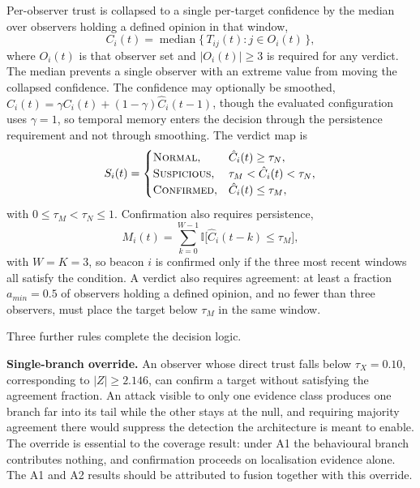 \documentclass[pdflatex,sn-mathphys-num]{sn-jnl}%
\theoremstyle{thmstyleone}%
\theoremstyle{thmstyletwo}%
\theoremstyle{thmstylethree}%
\begin{document}
Per-observer trust is collapsed to a single per-target confidence by the median
over observers holding a defined opinion in that window,
\begin{equation}
\label{eq:median}
C_i(t) = \operatorname{median}\{\, T_{ij}(t) : j \in O_i(t) \,\},
\end{equation}
where $O_i(t)$ is that observer set and $|O_i(t)| \ge 3$ is required for any
verdict. The median prevents a single observer with an extreme value from
moving the collapsed confidence. The confidence may optionally be smoothed,
$\hat C_i(t) = \gamma C_i(t) + (1-\gamma)\hat C_i(t-1)$, though the evaluated
configuration uses $\gamma = 1$, so temporal memory enters the decision through
the persistence requirement and not through smoothing. The verdict map is
\begin{equation}
\label{eq:verdict}
S_i(t) =
\begin{cases}
\textsc{Normal}, & \hat C_i(t) \ge \tau_N,\\
\textsc{Suspicious}, & \tau_M < \hat C_i(t) < \tau_N,\\
\textsc{Confirmed}, & \hat C_i(t) \le \tau_M,
\end{cases}
\end{equation}
with $0 \le \tau_M < \tau_N \le 1$. Confirmation also requires
persistence,
\begin{equation}
\label{eq:persist}
M_i(t) = \sum_{k=0}^{W-1} \mathbb{I}\bigl[\hat C_i(t-k) \le \tau_M\bigr],
\end{equation}
with $W = K = 3$, so beacon $i$ is confirmed only if the three most recent
windows all satisfy the condition. A verdict also requires agreement: at
least a fraction $a_{min} = 0.5$ of observers holding a defined opinion, and no
fewer than three observers, must place the target below $\tau_M$ in the same
window.

Three further rules complete the decision logic.

\textbf{Single-branch override.} An observer whose direct trust falls below
$\tau_X = 0.10$, corresponding to $|Z| \ge 2.146$, can confirm a target without
satisfying the agreement fraction. An attack visible to only one evidence class
produces one branch far into its tail while the other stays at the null, and
requiring majority agreement there would suppress the detection the
architecture is meant to enable. The override is essential to the coverage
result: under A1 the behavioural branch contributes nothing, and confirmation
proceeds on localisation evidence alone. The A1 and A2 results should be
attributed to fusion together with this override.
\end{document}
